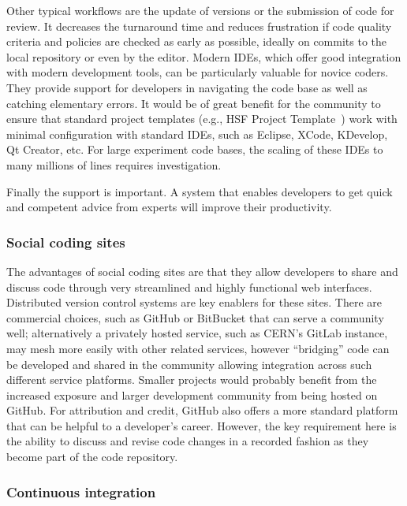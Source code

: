 \documentclass[12pt,a4paper]{article}
\begin{document}
Other typical workflows are the update of versions or the submission of
code for review. It decreases the turnaround time and reduces
frustration if code quality criteria and policies are checked as early
as possible, ideally on commits to the local repository or even by the
editor. Modern IDEs, which offer good integration with modern
development tools, can be particularly valuable for novice coders. They
provide support for developers in navigating the code base as well as
catching elementary errors. It would be of great benefit for the
community to ensure that standard project templates
(e.g., HSF Project Template~\cite{HSFProjectTemplate}) work
with minimal configuration with standard IDEs, such as Eclipse, XCode,
KDevelop, Qt Creator, etc. For large experiment code bases, the scaling
of these IDEs to many millions of lines requires investigation.

Finally the support is important. A system that enables developers to
get quick and competent advice from experts will improve their
productivity.

\hypertarget{social-coding-sites}{%
\subsubsection{Social coding sites}\label{social-coding-sites}}

The advantages of social coding sites are that they allow developers to
share and discuss code through very streamlined and highly functional
web interfaces. Distributed version control systems are key enablers for
these sites. There are commercial choices, such as GitHub or BitBucket %
that can serve a community well; alternatively a privately hosted
service, such as CERN's GitLab instance, may mesh more easily with other %
related services, however ``bridging'' code can be developed and shared
in the community allowing integration across such different service
platforms. Smaller projects would probably benefit from the increased
exposure and larger development community from being hosted on GitHub.
For attribution and credit, GitHub also offers a more standard platform
that can be helpful to a developer's career. However, the key
requirement here is the ability to discuss and revise code changes in a
recorded fashion as they become part of the code repository.

\hypertarget{continuous-integration}{%
\subsubsection{Continuous integration}\label{continuous-integration}}
\end{document}
